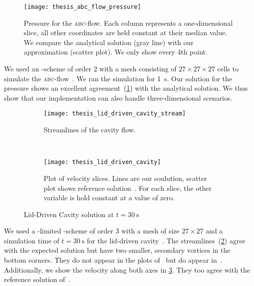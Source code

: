 \begin{figure}[htb]
  \centering
  \texttt{[image: thesis\_abc\_flow\_pressure]}
  \caption{\label{fig:abc-result}%
  Pressure for the \textsc{abc}-flow.
  Each column represents a one-dimensional slice, all other coordinates are held constant at their median value.
  We compare the analytical solution (gray line) with our approximation (scatter plot).
  We only show every 4th point.}
\end{figure}
We used an \aderdg{}-scheme of order 2 with a mesh consisting of $27 \times 27 \times 27$ cells to simulate the \textsc{abc}-flow~.
We ran the simulation for \SI{1}{\s}.
Our solution for the pressure shows an excellent agreement~(\cref{fig:abc-result}) with the analytical solution.
We thus show that our implementation can also handle three-dimensional scenarios.

\begin{figure}[htb]
  \centering
  \begin{subfigure}[t]{0.5\textwidth}
    \centering
    \texttt{[image: thesis\_lid\_driven\_cavity\_stream]}
    \caption{\label{fig:lid-driven-cavity-streamlines}%
      Streamlines of the cavity flow.}
  \end{subfigure}~%
  \begin{subfigure}[t]{0.5\textwidth}
    \centering
    \texttt{[image: thesis\_lid\_driven\_cavity]}
    \caption{\label{fig:lid-driven-cavity-result}%
      Plot of velocity slices. Lines are our soulution, scatter plot shows reference solution~\cite{ghia1982high}.
      For each slice, the other variable is hold constant at a value of zero.}
  \end{subfigure}
  
  \caption{\label{fig:lid-driven-cavity}%
    Lid-Driven Cavity solution at $t=\SI{30}{\s}$}
  
\end{figure}
We used a \muscl{}-limited \aderdg{}-scheme of order 3 with a mesh of size $27 \times 27$ and a simulation time of $t = \SI{30}{\s}$ for the lid-driven cavity~.
The streamlines~(\cref{fig:lid-driven-cavity-streamlines}) agree with the expected solution but have two smaller, secondary vortices in the bottom corners.
They do not appear in the plots of~\cite{dumbser2010arbitrary} but do appear in~\cite{ghia1982high}.
Additionally, we show the velocity along both axes in \cref{fig:lid-driven-cavity-result}.
They too agree with the reference solution of~\cite{ghia1982high}.

